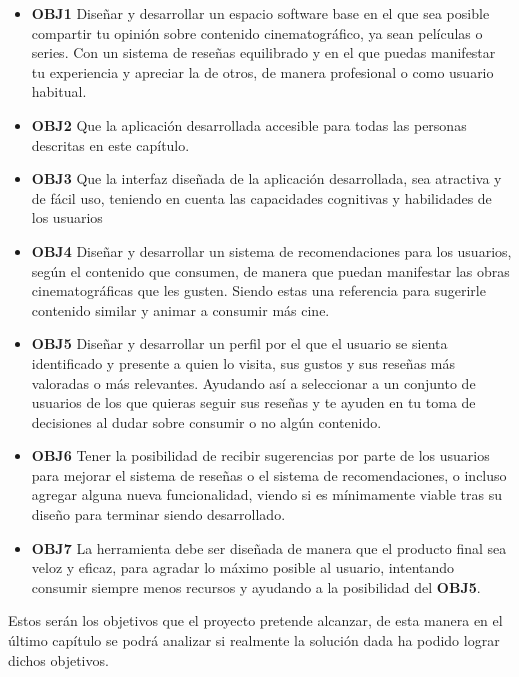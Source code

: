 \begin{itemize}
    \item \textbf{OBJ1} Diseñar y desarrollar un espacio software base en el que sea posible 
    compartir tu opinión sobre contenido cinematográfico, ya sean películas o series. Con un 
    sistema de reseñas equilibrado y en el que puedas manifestar tu experiencia y apreciar la de otros, 
    de manera profesional o como usuario habitual.
    \item \textbf{OBJ2} Que la aplicación desarrollada accesible para todas las personas descritas en 
    este capítulo.
    \item \textbf{OBJ3} Que la interfaz diseñada de la aplicación desarrollada, sea atractiva y de 
    fácil uso, teniendo en cuenta las capacidades cognitivas y habilidades de los usuarios
    \item \textbf{OBJ4} Diseñar y desarrollar un sistema de recomendaciones para los usuarios, según el 
    contenido que consumen, de manera que puedan manifestar las obras cinematográficas que les gusten. 
    Siendo estas una referencia para sugerirle contenido similar y animar a consumir más cine.
    \item \textbf{OBJ5} Diseñar y desarrollar un perfil por el que el usuario se sienta identificado y 
    presente a quien lo visita, sus gustos y sus reseñas más valoradas o más relevantes. Ayudando así a
    seleccionar a un conjunto de usuarios de los que quieras seguir sus reseñas y te ayuden en tu toma 
    de decisiones al dudar sobre consumir o no algún contenido.
    \item \textbf{OBJ6} Tener la posibilidad de recibir sugerencias por parte de los usuarios para 
    mejorar el sistema de reseñas o el sistema de recomendaciones, o incluso agregar alguna nueva 
    funcionalidad, viendo si es mínimamente viable tras su diseño para terminar siendo desarrollado.
    \item \textbf{OBJ7} La herramienta debe ser diseñada de manera que el producto final sea veloz y 
    eficaz, para agradar lo máximo posible al usuario, intentando consumir siempre menos recursos y 
    ayudando a la posibilidad del \textbf{OBJ5}.
\end{itemize}

Estos serán los objetivos que el proyecto pretende alcanzar, de esta manera en el último capítulo se 
podrá analizar si realmente la solución dada ha podido lograr dichos objetivos.